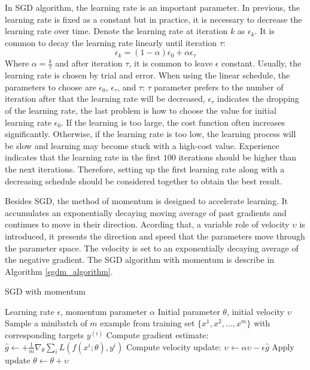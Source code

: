 In SGD algorithm, the learning rate is an important parameter. In previous, the learning rate is fixed as a constant but in practice, it is necessary to decrease the learning rate over time. Denote the learning rate at iteration $k$ as $\epsilon_k$. It is common to decay the learning rate linearly until iteration $\tau$:
\begin{equation}
	\epsilon_k = (1 - \alpha) \epsilon_0 + \alpha \epsilon_\tau
\end{equation}
Where $\alpha = \frac{k}{\tau}$ and after iteration $\tau$, it is common to leave $\epsilon$ constant. Usually, the learning rate is chosen by trial and error. When using the linear schedule, the parameters to choose are $\epsilon_0$, $\epsilon_\tau$, and $\tau$: $\tau$ parameter prefers to the number of iteration after that the learning rate will be decreased, $\epsilon_\tau$ indicates the dropping of the learning rate, the last problem is how to choose the value for initial learning rate $\epsilon_0$. If the learning is too large, the cost function often increases significantly. Otherwise, if the learning rate is too low, the learning process will be slow and learning may become stuck with a high-cost value. Experience indicates that the learning rate in the first $100$ iterations should be higher than the next iterations. Therefore, setting up the first learning rate along with a decreasing schedule should be considered together to obtain the best result.

Besides SGD, the method of momentum \cite{} is designed to accelerate learning. It accumulates an exponentially decaying moving average of past gradients and continues to move in their direction. Acording that, a variable role of velocity $\upsilon$ is introduced, it presents the direction and speed that the parameters move through the parameter space. The velocity is set to an exponentially decaying average of the negative gradient. The SGD algorithm with momentum is describe in Algorithm \ref{sgdm_algorithm}.

\begin{algorithm}
	\caption{SGD with momentum}
	\label{sgdm_algorithm}
	\begin{algorithmic}
		\REQUIRE Learning rate $\epsilon$, momentum parameter $\alpha$
		\REQUIRE Initial parameter $\theta$, initial velocity $\upsilon$
			\STATE Sample a minibatch of $m$ example from training set $\{ x^1,x^2,\ldots, x^m \}$ with corresponding targets $y^{(i)}$
			\STATE Compute gradient estimate: $\hat{g} \leftarrow + \frac{1}{m} \nabla_\theta \sum_i L(f(x^i;\theta), y^i) $
			\STATE Compute velocity update: $\upsilon \leftarrow \alpha \upsilon - \epsilon \hat{g} $
			\STATE Apply update $\theta \leftarrow \theta + \upsilon$
		\ENDWHILE
	\end{algorithmic}
\end{algorithm}

